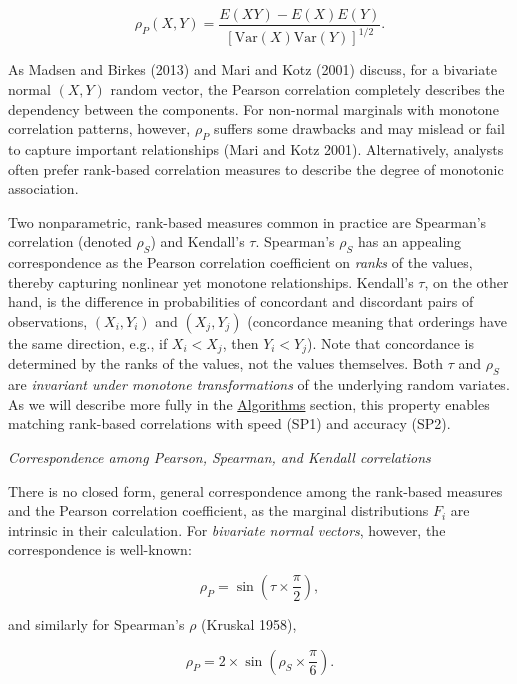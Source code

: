 \documentclass{article}
\begin{document}
\begin{equation}
\rho_P(X,Y) = \frac{E(XY) - E(X)E(Y)}{\left[ \mathrm{Var}(X)\mathrm{Var}(Y)\right]^{1/2}}.
\label{eq:pearson}
\end{equation}

As Madsen and Birkes (2013) and Mari and Kotz (2001) discuss, for a
bivariate normal \((X,Y)\) random vector, the Pearson correlation
completely describes the dependency between the components. For
non-normal marginals with monotone correlation patterns, however,
\(\rho_P\) suffers some drawbacks and may mislead or fail to capture
important relationships (Mari and Kotz 2001). Alternatively, analysts
often prefer rank-based correlation measures to describe the degree of
monotonic association.

Two nonparametric, rank-based measures common in practice are Spearman's
correlation (denoted \(\rho_S\)) and Kendall's \(\tau\). Spearman's
\(\rho_S\) has an appealing correspondence as the Pearson correlation
coefficient on \emph{ranks} of the values, thereby capturing nonlinear
yet monotone relationships. Kendall's \(\tau\), on the other hand, is
the difference in probabilities of concordant and discordant pairs of
observations, \((X_i, Y_i)\) and \((X_j, Y_j)\) (concordance meaning
that orderings have the same direction, e.g., if \(X_i < X_j\), then
\(Y_i < Y_j\)). Note that concordance is determined by the ranks of the
values, not the values themselves. Both \(\tau\) and \(\rho_S\) are
\emph{invariant under monotone transformations} of the underlying random
variates. As we will describe more fully in the
\protect\hyperlink{algorithms}{Algorithms} section, this property
enables matching rank-based correlations with speed (SP1) and accuracy
(SP2).

\emph{Correspondence among Pearson, Spearman, and Kendall correlations}

There is no closed form, general correspondence among the rank-based
measures and the Pearson correlation coefficient, as the marginal
distributions \(F_i\) are intrinsic in their calculation. For
\emph{bivariate normal vectors}, however, the correspondence is
well-known:

\begin{equation}
\label{eq:convertKendall}
\rho_{P} = \sin \left( \tau \times \frac{\pi}{2} \right), 
\end{equation}

\noindent and similarly for Spearman's \(\rho\) (Kruskal 1958),

\begin{equation}
\label{eq:convertSpearman}
\rho_P = 2 \times \sin \left( \rho_S \times \frac{\pi}{6} \right).
\end{equation}
\end{document}
